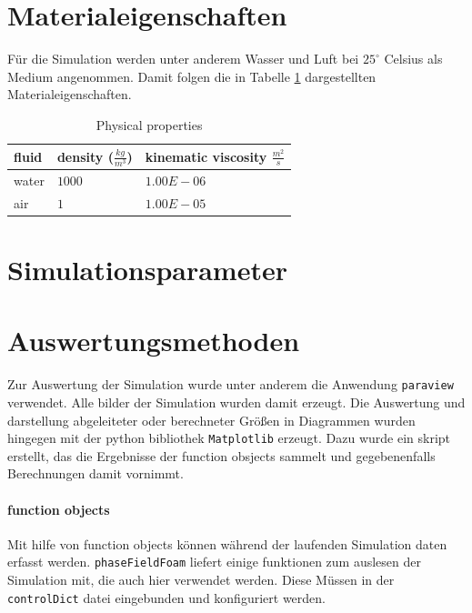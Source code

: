 \section{Materialeigenschaften}
Für die Simulation werden unter anderem Wasser und Luft bei $25^{\circ}$ Celsius als Medium angenommen. Damit folgen die in Tabelle \ref{tab:physicalProperties_CaseSetup} dargestellten Materialeigenschaften. 
\begin{table}[h]
    \centering
    \caption{Physical properties}
    \label{tab:physicalProperties_CaseSetup}
    \begin{tabular}{lll}
    fluid & density ($\frac{kg}{m^3}$) & kinematic viscosity $\frac{m^2}{s}$ \\ \hline
    water & $1000$                     & $1.00E-06$                          \\
    air   & $1$                        & $1.00E-05$                          \\ 
    \end{tabular}
    \end{table}


\section{Simulationsparameter}




\section{Auswertungsmethoden}
Zur Auswertung der Simulation wurde unter anderem die Anwendung \texttt{paraview} verwendet. Alle bilder der Simulation wurden damit erzeugt. Die Auswertung und darstellung abgeleiteter oder berechneter Größen in Diagrammen wurden hingegen mit der python bibliothek \texttt{Matplotlib} erzeugt. Dazu wurde ein skript erstellt, das die Ergebnisse der function obsjects sammelt und gegebenenfalls Berechnungen damit vornimmt. 
\paragraph{function objects}
Mit hilfe von function objects können während der laufenden Simulation daten erfasst werden. \texttt{phaseFieldFoam} liefert einige funktionen zum auslesen der Simulation mit, die auch hier verwendet werden. Diese Müssen in der \texttt{controlDict} datei eingebunden und konfiguriert werden. 

